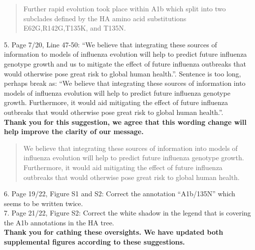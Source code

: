 \documentclass[11pt,oneside,letterpaper]{article}
\begin{document}
\begin{quotation}
  Further rapid evolution took place within A1b which split into two subclades defined by the HA amino acid substitutions E62G,R142G,T135K, and T135N.
\end{quotation}

5. Page 7/20, Line 47-50: “We believe that integrating these sources of information to models of influenza evolution will help to predict future influenza genotype growth and us to mitigate the effect of future influenza outbreaks that would otherwise pose great risk to global human health.”. Sentence is too long, perhaps break as: “We believe that integrating these sources of information into models of influenza evolution will help to predict future influenza genotype growth. Furthermore, it would aid mitigating the effect of future influenza outbreaks that would otherwise pose great risk to global human health.”.\\

\textbf{Thank you for this suggestion, we agree that this wording change will help improve the clarity of our message.}

\begin{quotation}
  We believe that integrating these sources of information into models of influenza evolution will help to predict future influenza genotype growth.
  Furthermore, it would aid mitigating the effect of future influenza outbreaks that would otherwise pose great risk to global human health.
\end{quotation}

6. Page 19/22, Figure S1 and S2: Correct the annotation “A1b/135N” which seems to be written twice.\\

7. Page 21/22, Figure S2: Correct the white shadow in the legend that is covering the A1b annotations in the HA tree.\\

\textbf{Thank you for cathing these oversights. We have updated both supplemental figures according to these suggestions.}

\clearpage
\renewcommand{\thefigure}{S\arabic{figure}}
\end{document}
